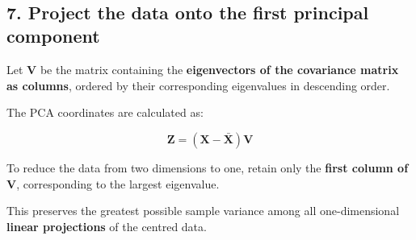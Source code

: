 \documentclass[11pt]{article}
\begin{document}
    \begin{center}
    \end{center}
    { \hspace*{\fill} \\}
    

    \subsection{7. Project the data onto the first principal
component}\label{project-the-data-onto-the-first-principal-component}

Let \(\mathbf V\) be the matrix containing the \textbf{eigenvectors of
the covariance matrix as columns}, ordered by their corresponding
eigenvalues in descending order.

The PCA coordinates are calculated as:

\[
\mathbf Z=(\mathbf X-\bar{\mathbf X})\mathbf V
\]

To reduce the data from two dimensions to one, retain only the
\textbf{first column of \(\mathbf V\)}, corresponding to the largest
eigenvalue.

This preserves the greatest possible sample variance among all
one-dimensional \textbf{linear projections} of the centred data.
\end{document}
